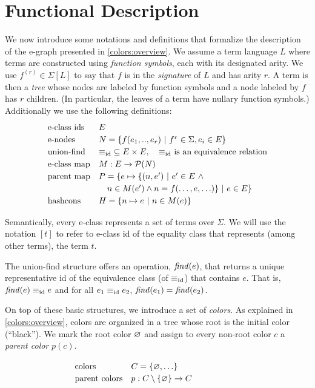 \section{Functional Description}
\label{colors:functional}

We now introduce some notations and definitions that formalize
the description of the e-graph presented in \autoref{colors:overview}.
We assume a term language $L$ where terms are constructed using \emph{function symbols}, each with its designated arity.
We use $f^{(r)}\in\Sigma[L]$ to say that $f$ is
in the \emph{signature} of $L$ and has arity $r$.
A term is then a \emph{tree} whose nodes are labeled by function symbols and a node labeled by $f$ has $r$ children.
(In particular, the leaves of a term have nullary function symbols.)
Additionally we use the following definitions:
%
\[
\renewcommand\arraystretch{1.2}
\begin{array}{ll}
  \mbox{e-class ids} & E  \\
  \mbox{e-nodes}  & N = \{f(e_1,..,e_r)~|~ f^r\in\Sigma, e_i\in E\} \\
  \mbox{union-find} & {\eqid} \subseteq E\times E, \quad \mbox{${\eqid}$ is an equivalence relation} \\
  \mbox{e-class map} & M : E \to \mathcal{P}(N) \\
  \mbox{parent map}  & P = \{e \mapsto \{ (n, e') ~|~ e' \in E~\land \\
  & \quad n \in M(e') \land n = f(\ldots, e, \ldots) \} ~|~ e \in E \} \\
  \mbox{hashcons} & H = \{n\mapsto e ~|~ n\in M(e)\} \\
\end{array}
\]

Semantically, every e-class represents a set of terms over $\Sigma$.
We will use the notation $[t]$ to refer to e-class id of the equality class that represents (among other terms), the term $t$.

The union-find structure offers an operation, $\mathit{find}(e)$, that returns a unique representative id of the equivalence class (of $\equiv_{\mathrm{id}}$) that contains $e$.
That is, $\mathit{find}(e) \equiv_{\mathrm{id}} e$ and for all $e_1 \equiv_{\mathrm{id}} e_2$, $\mathit{find}(e_1) = \mathit{find}(e_2)$.

On top of these basic structures, we introduce a set of \emph{colors}. 
As explained in \autoref{colors:overview}, colors are organized in a tree whose root is the initial color (``black'').
We mark the root color $\varnothing$
and assign to every non-root color $c$ a \emph{parent color} $p(c)$.
%
\begin{comment}
\[
\begin{array}{ll@{~~~}l}
\mbox{color tree} & C = \{\croot, \ldots\}
& p : C \setminus \{\croot\} \to C
\end{array}
\]
\end{comment}
\[
\renewcommand\arraystretch{1.2}
\begin{array}{ll}
  \mbox{colors} & C = \{\croot, \ldots\}  \\
  \mbox{parent colors} & p : C \setminus \{\croot\} \to C
\end{array}\hspace{2cm}
\]

